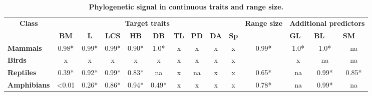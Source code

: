 
\begin{table}[h!]
\renewcommand{\baselinestretch}{1}
\renewcommand{\arraystretch}{1.5}
\begin{center}\fontsize{9}{11}\selectfont
\caption[Phylogenetic signal in continuous traits]{\textbf{Phylogenetic signal in continuous traits and range size.}} 
\label{physignalcont}
\begin{tabular}{|l|c|c|c|c|c|c|c|c|c|c|c|c|c|}
\hline
\multicolumn{1}{|c|}{\multirow{2}{*}{\textbf{Class}}} & \multicolumn{9}{c|}{\textbf{Target traits}}                                                                                     & \multirow{2}{*}{\textbf{Range size}} & \multicolumn{3}{l|}{\textbf{Additional predictors}}                                                    \\ \cline{2-10} \cline{12-14} 
\multicolumn{1}{|c|}{}                                & \textbf{BM}     & \textbf{L} & \textbf{LCS} & \textbf{HB} & \textbf{DB} & \textbf{TL} & \textbf{PD} & \textbf{DA} & \textbf{Sp} &                                      & \multicolumn{1}{l|}{\textbf{GL}} & \multicolumn{1}{l|}{\textbf{BL}} & \multicolumn{1}{l|}{\textbf{SM}} \\ \hline
\textbf{Mammals}                                      & 0.98*           & 0.99*      & 0.99*        & 0.90*       & 1.0*        & x           & x           & x           & x           & 0.99*                                & 1.0*                             & 1.0*                             & na                               \\ \hline
\textbf{Birds}                                        & x               & x          & x            & x           & x           & x           & x           & x           & x           &                                      & x                                & na                               & na                               \\ \hline
\textbf{Reptiles}                                     & 0.39*           & 0.92*      & 0.99*        & 0.83*       & na          & x           & na          & x           & x           & 0.65*                                & na                               & 0.99*                            & 0.85*                            \\ \hline
\textbf{Amphibians}                                   & \textless{}0.01 & 0.26*      & 0.86*        & 0.94*       & 0.49*       & x           & x           & x           & x           & 0.78*                                & na                               & 0.99*                            & na                               \\ \hline
\end{tabular}
\end{center}
\end{table}



